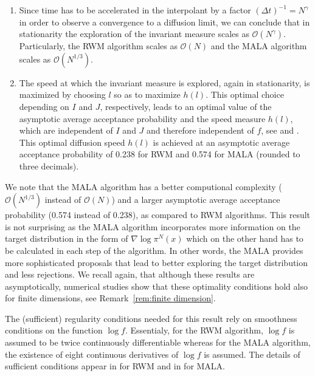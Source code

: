\begin{enumerate}
 \item Since time has to be accelerated in the interpolant by a factor $ \left( \Delta t \right)^{-1} = N^{\gamma}$ in order to observe a convergence to a diffusion limit, we can conclude that in stationarity the exploration of the invariant measure scales as $ \mathcal{O}(N^{\gamma}) $. Particularly, the RWM algorithm scales as $ \mathcal{O}(N) $ and the MALA algorithm scales as $ \mathcal{O}(N^{1/3}) $.
 \item The speed at which the invariant measure is explored, again in stationarity, is maximized by choosing $l$ so as to maximize $h(l)$. This optimal choice depending on $I$ and $J$, respectively, leads to an optimal value of the asymptotic average acceptance probability and the speed measure $h(l)$, which are independent of $I$ and $J$ and therefore independent of $f$, see \autocite{Roberts1997} and \autocite{Roberts1998}. This optimal diffusion speed $h(l)$ is achieved at an asymptotic average acceptance probability of 0.238 for  RWM and 0.574 for MALA (rounded to three decimals).
\end{enumerate}

We note that the MALA algorithm has a better computional complexity ($ \mathcal{O}(N^{1/3}) $ instead of $ \mathcal{O}(N) $) and a larger asymptotic average acceptance probability (0.574 instead of 0.238), as compared to RWM algorithms. This result is not surprising as the MALA algorithm incorporates more information on the target distribution in the form of $ \nabla \log \pi^{N}(x) $ which on the other hand has to be calculated in each step of the algorithm. In other words, the MALA provides more sophisticated proposals that lead to better exploring the target distribution and less rejections. We recall again, that although these results are asymptotically, numerical studies show that these optimality conditions hold also for finite dimensions, see Remark~\ref{rem:finite dimension}.

\begin{rem}
\label{rem:Conditions on f}
 The (sufficient) regularity conditions needed for this result rely on smoothness conditions on the function $\log f$. Essentialy, for the RWM algorithm, $\log f$ is assumed to be twice continuously differentiable whereas for the MALA algorithm, the existence of eight continuous derivatives of $\log f$ is assumed. The details of sufficient conditions appear in \autocite{Roberts1997} for RWM and in \autocite{Roberts1998} for MALA.
\end{rem}





